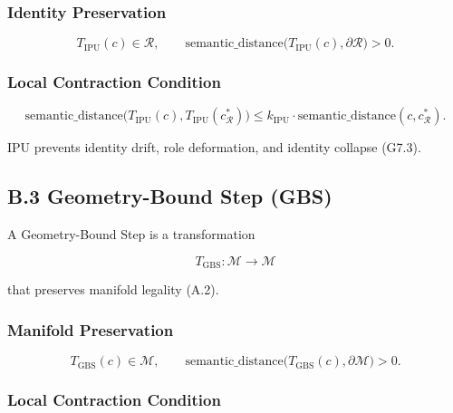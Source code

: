 \subsubsection*{Identity Preservation}



\[
T_{\mathrm{IPU}}(c) \in \mathcal{R},
\qquad
\text{semantic\_distance}\big(T_{\mathrm{IPU}}(c), \partial \mathcal{R}\big) > 0.
\]



\subsubsection*{Local Contraction Condition}



\[
\text{semantic\_distance}\big(T_{\mathrm{IPU}}(c), T_{\mathrm{IPU}}(c_{\mathcal{R}}^*)\big)
\le k_{\mathrm{IPU}} \cdot \text{semantic\_distance}(c, c_{\mathcal{R}}^*).
\]



\noindent IPU prevents identity drift, role deformation, and identity collapse
(G7.3).


\subsection*{B.3 Geometry-Bound Step (GBS)}

\noindent A Geometry-Bound Step is a transformation



\[
T_{\mathrm{GBS}} : \mathcal{M} \rightarrow \mathcal{M}
\]



that preserves manifold legality (A.2).

\subsubsection*{Manifold Preservation}



\[
T_{\mathrm{GBS}}(c) \in \mathcal{M},
\qquad
\text{semantic\_distance}\big(T_{\mathrm{GBS}}(c), \partial \mathcal{M}\big) > 0.
\]



\subsubsection*{Local Contraction Condition}



